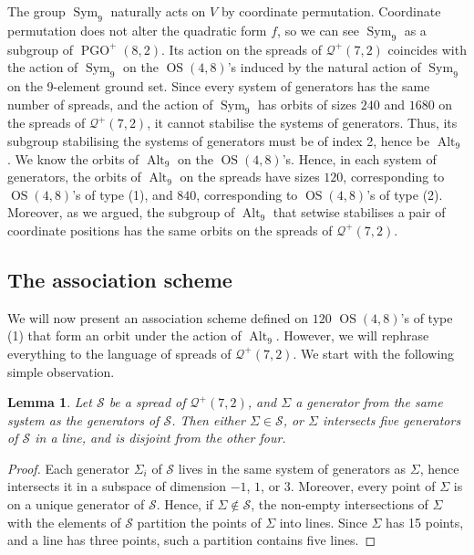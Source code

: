 \documentclass[10pt,a4paper]{amsart}
\newtheorem{lm}[thm]{Lemma}
\newcommand{\mq}{\mathcal Q}
\newcommand{\ms}{\mathcal S}
\DeclareMathOperator{\PGO}{PGO}
\DeclareMathOperator{\Sym}{Sym}
\DeclareMathOperator{\OS}{OS}
\DeclareMathOperator{\Alt}{Alt}
\begin{document}
The group $\Sym_9$ naturally acts on $V$ by coordinate permutation.
Coordinate permutation does not alter the quadratic form $f$, so we can see $\Sym_9$ as a subgroup of $\PGO^+(8,2)$.
Its action on the spreads of $\mq^+(7,2)$ coincides with the action of $\Sym_9$ on the $\OS(4,8)$'s induced by the natural action of $\Sym_9$ on the 9-element ground set.
Since every system of generators has the same number of spreads, and the action of $\Sym_9$ has orbits of sizes $240$ and $1680$ on the spreads of $\mq^+(7,2)$, it cannot stabilise the systems of generators.
Thus, its subgroup stabilising the systems of generators must be of index 2, hence be $\Alt_9$.
We know the orbits of $\Alt_9$ on the $\OS(4,8)$'s.
Hence, in each system of generators, the orbits of $\Alt_9$ on the spreads have sizes $120$, corresponding to $\OS(4,8)$'s of type (1), and $840$, corresponding to $\OS(4,8)$'s of type (2).
Moreover, as we argued, the subgroup of $\Alt_9$ that setwise stabilises a pair of coordinate positions has the same orbits on the spreads of $\mq^+(7,2)$.

\subsection{The association scheme}
 \label{Sec:Assoc:Spreads}

We will now present an association scheme defined on $120$ $\OS(4,8)$'s of type (1) that form an orbit under the action of $\Alt_9$.
However, we will rephrase everything to the language of spreads of $\mq^+(7,2)$.
We start with the following simple observation.

\begin{lm}
 Let $\ms$ be a spread of $\mq^+(7,2)$, and $\Sigma$ a generator from the same system as the generators of $\ms$.
 Then either $\Sigma \in \ms$, or $\Sigma$ intersects five generators of $\ms$ in a line, and is disjoint from the other four.
\end{lm}

\begin{proof}
 Each generator $\Sigma_i$ of $\ms$ lives in the same system of generators as $\Sigma$, hence intersects it in a subspace of dimension $-1$, $1$, or $3$.
 Moreover, every point of $\Sigma$ is on a unique generator of $\ms$.
 Hence, if $\Sigma \notin \ms$, the non-empty intersections of $\Sigma$ with the elements of $\ms$ partition the points of $\Sigma$ into lines.
 Since $\Sigma$ has 15 points, and a line has three points, such a partition contains five lines.
\end{proof}
\end{document}

